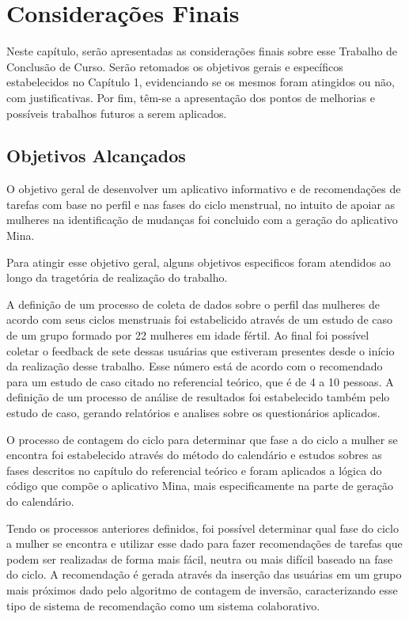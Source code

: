 \chapter[Considerações Finais]{Considerações Finais}
\label{ch:conclusao}

Neste capítulo, serão apresentadas as considerações finais sobre esse Trabalho de
Conclusão de Curso. Serão retomados os objetivos gerais e específicos estabelecidos no
Capítulo 1, evidenciando se os mesmos foram atingidos ou não, com justificativas. Por fim,
têm-se a apresentação dos pontos de melhorias e possíveis trabalhos futuros a serem aplicados.

\section{Objetivos Alcançados}

O objetivo geral de desenvolver um aplicativo informativo e de recomendações de tarefas 
com base no perfil e 
nas fases do ciclo menstrual, no intuito de apoiar as mulheres na identificação de mudanças 
foi concluido com a geração 
do aplicativo Mina.

Para atingir esse objetivo geral, alguns objetivos especificos foram atendidos ao longo da tragetória de 
realização do trabalho. 

A definição de um processo de coleta de dados sobre o perfil das mulheres de acordo com seus ciclos 
menstruais foi estabelicido através de um estudo de caso de um grupo formado por 22 mulheres em idade fértil. 
Ao final foi possível coletar o feedback de sete dessas usuárias que estiveram presentes 
desde o início da realização desse trabalho. Esse número está de acordo com o recomendado para um 
estudo de caso citado no referencial teórico, que é de 4 a 10 pessoas. A definição de um processo de 
análise de resultados foi estabelecido também pelo estudo de caso, gerando 
relatórios e analises sobre os questionários aplicados.

O processo de contagem do ciclo para determinar que fase a do ciclo a mulher se encontra foi estabelecido 
através do método do calendário e estudos sobres as fases descritos no capítulo do referencial teórico e foram 
aplicados a lógica do código que compõe o aplicativo Mina, mais especificamente na parte de geração do calendário.

Tendo os processos anteriores definidos, foi possível determinar qual fase do ciclo a mulher 
se encontra e utilizar esse dado para fazer recomendações de tarefas que podem 
ser realizadas de forma mais fácil, neutra ou mais difícil baseado na fase do ciclo. A 
recomendação é gerada 
através da inserção das usuárias em um grupo mais próximos dado pelo algoritmo de contagem de 
inversão, caracterizando esse tipo de sistema de recomendação como um sistema colaborativo.

